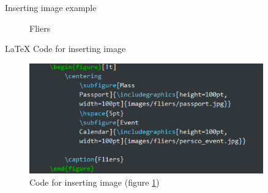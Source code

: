 \documentclass{beamer}
\begin{document}
	\begin{frame}{Inserting image example}
		\begin{figure}[!t]
			\centering
				 \hspace{5pt}
			
			\caption{Fliers}
			\label{fig:figure1}
		\end{figure}
	\end{frame}
	\begin{frame}{LaTeX Code for inserting image}
		\begin{figure}
			\includegraphics[width=0.9\textwidth, height=0.6\textheight]{images/code/fliers_code.png}
			
			\caption{Code for inserting image (figure \ref{fig:figure1}) }
		\end{figure}
	\end{frame}
	
	
	
\end{document}
